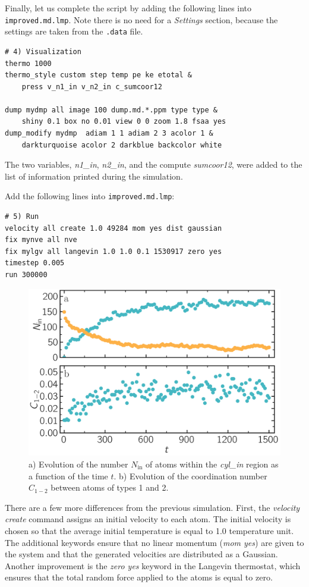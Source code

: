 \documentclass[9pt,tutorial]{livecoms}
\newcommand{\flecmd}[1]{\textcolor{command}{\texttt{#1}}} %
\begin{document}
Finally, let us complete the script by adding the following lines into
\flecmd{improved.md.lmp}.  Note there is no
need for a \textit{Settings} section, because the settings are taken
from the \flecmd{.data} file.
\begin{lstlisting}
# 4) Visualization
thermo 1000
thermo_style custom step temp pe ke etotal &
    press v_n1_in v_n2_in c_sumcoor12

dump mydmp all image 100 dump.md.*.ppm type type &
    shiny 0.1 box no 0.01 view 0 0 zoom 1.8 fsaa yes
dump_modify mydmp  adiam 1 1 adiam 2 3 acolor 1 &
    darkturquoise acolor 2 darkblue backcolor white
\end{lstlisting}
The two variables, \textit{n1\_in}, \textit{n2\_in}, and the compute
\textit{sumcoor12}, were added to the list of information printed during
the simulation.

Add the following lines into \flecmd{improved.md.lmp}:
\begin{lstlisting}
# 5) Run
velocity all create 1.0 49284 mom yes dist gaussian
fix mynve all nve
fix mylgv all langevin 1.0 1.0 0.1 1530917 zero yes
timestep 0.005
run 300000
\end{lstlisting}

\begin{figure}
\centering
\includegraphics[width=\linewidth]{LJ-mixing}
\caption{a) Evolution of the number $N_\text{in}$ of atoms within the
\textit{cyl\_in} region as a function of the time $t$. b) Evolution of
the coordination number $C_{1-2}$ between atoms of types 1 and 2.}
\label{fig:mixing}
\end{figure}

There are a few more differences from the previous simulation.  First,
the \textit{velocity create} command assigns an initial velocity to each
atom.  The initial velocity is chosen so that the average initial
temperature is equal to 1.0 temperature unit.  The additional keywords
ensure that no linear momentum (\textit{mom yes}) are given to the
system and that the generated velocities are distributed as a Gaussian.
Another improvement is the \textit{zero yes} keyword in the Langevin
thermostat, which ensures that the total random force applied to the
atoms is equal to zero.
\end{document}
